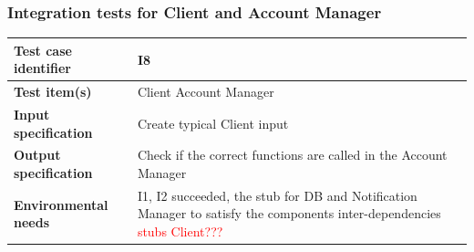 \documentclass[a4paper,11pt]{report} %
\begin{document}
		\subsubsection{Integration tests for Client and Account Manager} \label{sec:3.1.5}
			\begin{minipage}{\linewidth}
			\end{minipage}		
		\begin{center}
			\renewcommand{\arraystretch}{1.2}
			\setlength{\tabcolsep}{24pt}
			\begin{tabular}{ l  p{9cm}}\hline
				\textbf{Test case identifier} & I8\\\hline
				\textbf{Test item(s)} & Client \textrightarrow Account Manager\\\hline
				\textbf{Input specification} & Create typical Client input \\\hline
				\textbf{Output specification} & Check if the correct functions are called in the Account Manager\\\hline
				\textbf{Environmental needs} &  I1, I2 succeeded, the stub for DB and Notification Manager to satisfy the components inter-dependencies \textcolor{red}{stubs Client???}\\\hline
			\end{tabular}
		\end{center}	
\end{document}
